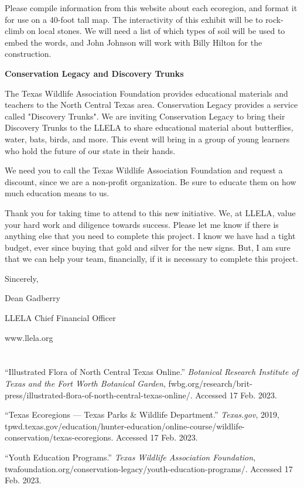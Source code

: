 \documentclass[12pt,a4paper,english]{article}
\begin{document}
\begin{flushleft}
Please compile information from this website about each ecoregion, and format it for use on a 40-foot tall map. The interactivity of this exhibit will be to rock-climb on local stones. We will need a list of which types of soil will be used to embed the words, and John Johnson will work with Billy Hilton for the construction.

\hfill\break
\textbf{Conservation Legacy and Discovery Trunks}
\par
The Texas Wildlife Association Foundation provides educational materials and teachers to the North Central Texas area. Conservation Legacy provides a service called "Discovery Trunks". We are inviting Conservation Legacy to bring their Discovery Trunks to the LLELA to share educational material about butterflies, water, bats, birds, and more. This event will bring in a group of young learners who hold the future of our state in their hands.

We need you to call the Texas Wildlife Association Foundation and request a discount, since we are a non-profit organization. Be sure to educate them on how much education means to us. 

\hfill\break
Thank you for taking time to attend to this new initiative. We, at LLELA, value your hard work and diligence towards success. Please let me know if there is anything else that you need to complete this project. I know we have had a tight budget, ever since buying that gold and silver for the new signs. But, I am sure that we can help your team, financially, if it is necessary to complete this project.

\hfill\break
Sincerely,

Dean Gadberry

LLELA Chief Financial Officer

www.llela.org


\pagebreak
\section*{}
\begin{hangparas}{2em}{1}
  “Illustrated Flora of North Central Texas Online.” \emph{Botanical Research Institute of Texas and the Fort Worth Botanical Garden}, fwbg.org/research/brit-press/illustrated-flora-of-north-central-texas-online/. Accessed 17 Feb. 2023.

  “Texas Ecoregions — Texas Parks \& Wildlife Department.” \emph{Texas.gov}, 2019, tpwd.texas.gov/education/hunter-education/online-course/wildlife-conservation/texas-ecoregions. Accessed 17 Feb. 2023.

“Youth Education Programs.” \emph{Texas Wildlife Association Foundation}, twafoundation.org/conservation-legacy/youth-education-programs/. Accessed 17 Feb. 2023.
\end{hangparas}
\end{flushleft}
\end{document}
